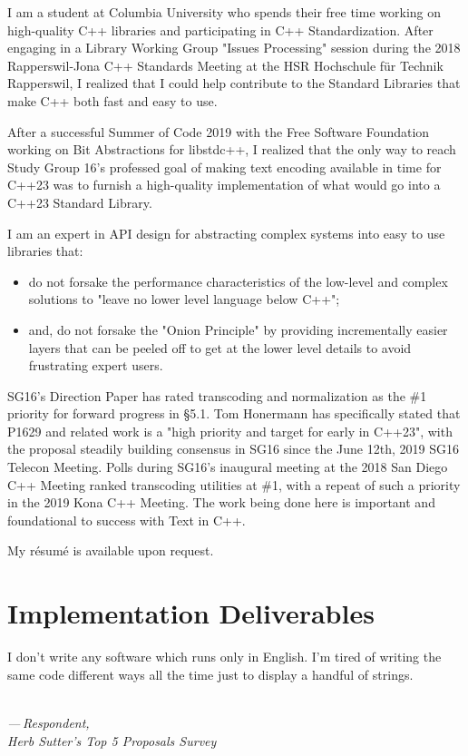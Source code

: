 \documentclass{wg21}
\begin{document}
I am a student at Columbia University who spends their free time working on high-quality C++ libraries\cite{sol2} and participating in C++ Standardization\cite{c++_standardization}. After engaging in a Library Working Group "Issues Processing" session during the 2018 Rapperswil-Jona C++ Standards Meeting at the HSR Hochschule für Technik Rapperswil, I realized that I could help contribute to the Standard Libraries that make C++ both fast and easy to use.

After a successful Summer of Code 2019 with the Free Software Foundation working on Bit Abstractions for libstdc++\cite{c++_gsoc_2019}, I realized that the only way to reach Study Group 16's professed goal of making text encoding available in time for C++23 was to furnish a high-quality implementation of what would go into a C++23 Standard Library.

I am an expert in API design for abstracting complex systems into easy to use libraries that:

\begin{itemize}
	\item do not forsake the performance characteristics of the low-level and complex solutions to "leave no lower level language below C++";
	\item and, do not forsake the "Onion Principle" by providing incrementally easier layers that can be peeled off to get at the lower level details to avoid frustrating expert users.
\end{itemize}

SG16's Direction Paper\cite{p1238} has rated transcoding and normalization as the \#1 priority for forward progress in §5.1. Tom Honermann has specifically stated that P1629 and related work is a "high priority and target for early in C++23", with the proposal steadily building consensus in SG16 since the June 12th, 2019 SG16 Telecon Meeting\cite{sg16_telecon_june_12_2019}. Polls during SG16's inaugural meeting at the 2018 San Diego C++ Meeting ranked transcoding utilities at \#1, with a repeat of such a priority in the 2019 Kona C++ Meeting. The work being done here is important and foundational to success with Text in C++.

My résumé is available upon request.


\section{Implementation Deliverables}

\epigraph{I don't write any software which runs only in English. I'm tired of writing the same code different ways all the time just to display a handful of strings.}{\textit{\\— Respondent,\\Herb Sutter's Top 5 Proposals Survey}}
\end{document}
